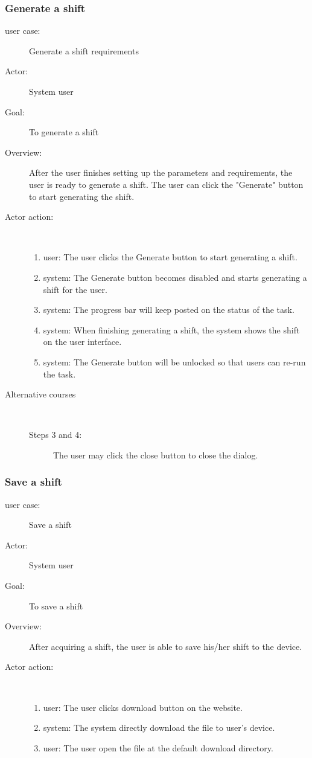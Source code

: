 \documentclass[11pt, oneside]{article}   	%
\begin{document}
\subsubsection{Generate a shift}
\begin{description}
\item[user case:] Generate a shift requirements
\item[Actor:] System user
\item[Goal:] To generate a shift
\item[Overview:]After the user finishes setting up the parameters and requirements, the user is ready to generate a shift. The user can click the "Generate" button to start generating the shift.
\item[Actor action:]
\
\begin{enumerate}
\item user: The user clicks the Generate button to start generating a shift.
\item system: The Generate button becomes disabled and starts generating a shift for the user.
\item system: The progress bar will keep posted on the status of the task.
\item system: When finishing generating a shift, the system shows the shift on the user interface.
\item system: The Generate button will be unlocked so that users can re-run the task.
\end{enumerate}
\item[Alternative courses]
\
\begin{description}
\item[Steps 3 and 4:] The user may click the close button to close the dialog.
\end{description}
\end{description}

\subsubsection{Save a shift}
\begin{description}
\item[user case:] Save a shift
\item[Actor:] System user
\item[Goal:] To save a shift
\item[Overview:]After acquiring a shift, the user is able to save his/her shift to the device.
\item[Actor action:]
\
\begin{enumerate}
\item user: The user clicks download button on the website.
\item system: The system directly download the file to user's device.
\item user: The user open the file at the default download directory.
\end{enumerate}
\end{description}
\end{document}
